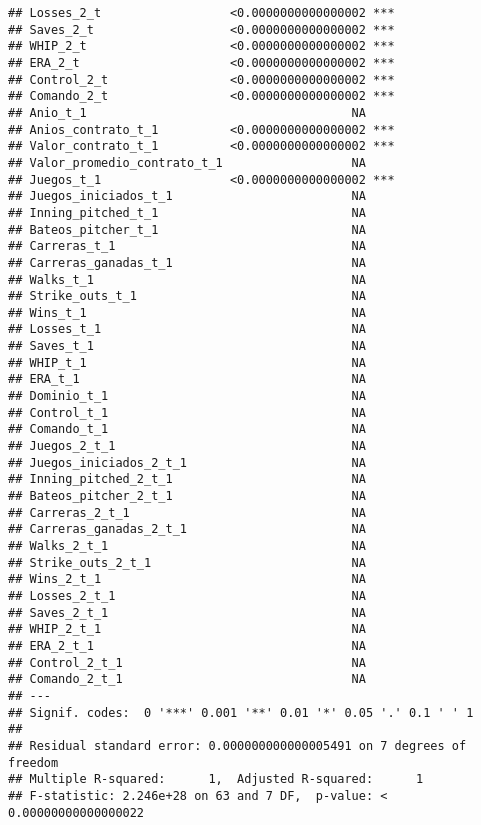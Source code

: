 \documentclass[
]{article}
\begin{document}
\begin{verbatim}
## Losses_2_t                  <0.0000000000000002 ***
## Saves_2_t                   <0.0000000000000002 ***
## WHIP_2_t                    <0.0000000000000002 ***
## ERA_2_t                     <0.0000000000000002 ***
## Control_2_t                 <0.0000000000000002 ***
## Comando_2_t                 <0.0000000000000002 ***
## Anio_t_1                                     NA    
## Anios_contrato_t_1          <0.0000000000000002 ***
## Valor_contrato_t_1          <0.0000000000000002 ***
## Valor_promedio_contrato_t_1                  NA    
## Juegos_t_1                  <0.0000000000000002 ***
## Juegos_iniciados_t_1                         NA    
## Inning_pitched_t_1                           NA    
## Bateos_pitcher_t_1                           NA    
## Carreras_t_1                                 NA    
## Carreras_ganadas_t_1                         NA    
## Walks_t_1                                    NA    
## Strike_outs_t_1                              NA    
## Wins_t_1                                     NA    
## Losses_t_1                                   NA    
## Saves_t_1                                    NA    
## WHIP_t_1                                     NA    
## ERA_t_1                                      NA    
## Dominio_t_1                                  NA    
## Control_t_1                                  NA    
## Comando_t_1                                  NA    
## Juegos_2_t_1                                 NA    
## Juegos_iniciados_2_t_1                       NA    
## Inning_pitched_2_t_1                         NA    
## Bateos_pitcher_2_t_1                         NA    
## Carreras_2_t_1                               NA    
## Carreras_ganadas_2_t_1                       NA    
## Walks_2_t_1                                  NA    
## Strike_outs_2_t_1                            NA    
## Wins_2_t_1                                   NA    
## Losses_2_t_1                                 NA    
## Saves_2_t_1                                  NA    
## WHIP_2_t_1                                   NA    
## ERA_2_t_1                                    NA    
## Control_2_t_1                                NA    
## Comando_2_t_1                                NA    
## ---
## Signif. codes:  0 '***' 0.001 '**' 0.01 '*' 0.05 '.' 0.1 ' ' 1
## 
## Residual standard error: 0.000000000000005491 on 7 degrees of freedom
## Multiple R-squared:      1,  Adjusted R-squared:      1 
## F-statistic: 2.246e+28 on 63 and 7 DF,  p-value: < 0.00000000000000022
\end{verbatim}
\end{document}
